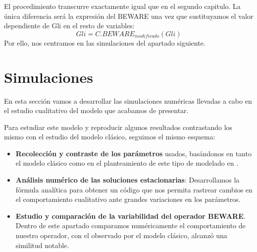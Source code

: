 El procedimiento transcurre exactamente igual que en el segundo capitulo. La única diferencia será la expresión del BEWARE una vez que sustituyamos el valor dependiente de Gli en el resto de variables:
\begin{equation}
Gli=C.BEWARE_{modificado}(Gli)
\end{equation} Por ello, nos centramos en las simulaciones del apartado siguiente.


\section{Simulaciones}
En esta sección vamos a desarrollar las simulaciones numéricas llevadas a cabo en el estudio cualitativo del modelo que acabamos de presentar.

Para estudiar este modelo y reproducir algunos resultados contrastando los mismo con el estudio del modelo clásico, seguimos el mismo esquema:
\begin{itemize}
	\item \textbf{Recolección y contraste de los parámetros} usados, basándonos en tanto el modelo clásico como en el planteamiento de este tipo de modelado en \cite{cambon1}. 
	\item \textbf{Análisis numérico de las soluciones estacionarias}: Desarrollamos la fórmula analítica para obtener un código que nos permita rastrear cambios en el comportamiento cualitativo ante grandes variaciones en los parámetros.
	\item \textbf{Estudio y comparación de la variabilidad del operador BEWARE}. Dentro de este apartado comparamos numéricamente el comportamiento de nuestro operador, con el observado por el modelo clásico, alcanzó una similitud notable.

\end{itemize}
